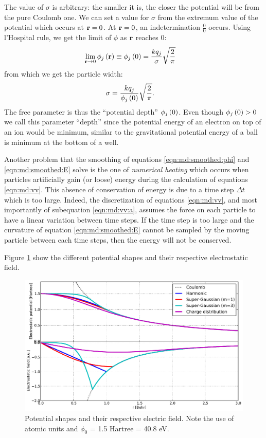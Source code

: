 The value of $\sigma$ is arbitrary: the smaller it is, the closer the potential
will be from the pure Coulomb one. We can set a value for $\sigma$ from the
extremum value of the potential which occurs at $\textbf{r} = 0$. At $\textbf{r} = 0$, an
indetermination $\frac{0}{0}$ occurs. Using l'Hospital rule, we get the limit
of $\phi$ as $\textbf{r}$ reaches 0:
\begin{align}
\lim_{\textbf{r} \rightarrow 0} \phi_j\left( \textbf{r} \right)
    & \equiv \phi_j\left( 0 \right) = \frac{ k q_j }{ \sigma } \sqrt{\frac{2}{\pi}}
\end{align}
from which we get the particle width:
\begin{align}
\sigma & = \frac{ k q_j }{ \phi_j\left( 0 \right) } \sqrt{ \frac{2}{\pi}}.
\label{eqn:md:sigma}
\end{align}
The free parameter is thus the ``potential depth'' $\phi_j\left( 0 \right)$. Even
though $\phi_j\left( 0 \right) > 0$ we call this parameter ``depth'' since the potential
energy of an electron on top of an ion would be minimum, similar to the
gravitational potential energy of a ball is minimum at the bottom of a well.

Another problem that the smoothing of equations \eqref{eqn:md:smoothed:phi} and
\eqref{eqn:md:smoothed:E} solve is the one of \textit{numerical heating} which
occurs when particles artificially gain (or loose) energy during the
calculation of equations \eqref{eqn:md:vv}. This absence of conservation of
energy is due to a time step $\Delta t$ which is too large. Indeed, the
discretization of equations \eqref{eqn:md:vv}, and most importantly of
subequation \eqref{eqn:md:vv:a}, assumes the force on each particle to have a
linear variation between time steps. If the time step is too large and the
curvature of equation \eqref{eqn:md:smoothed:E} cannot be sampled by the moving
particle between each time steps, then the energy will not be conserved.



Figure \ref{fig:potential:shapes} show the different potential shapes and their
respective electrostatic field.

\begin{figure}
    \begin{center}
\includegraphics[width=0.98\columnwidth]{figures/potential_shapes}
    \end{center}
    \caption{\label{fig:potential:shapes}Potential shapes and their respective
    electric field. Note the use of atomic units and $\phi_0$ = 1.5 Hartree =
    40.8 eV.}
\end{figure}

